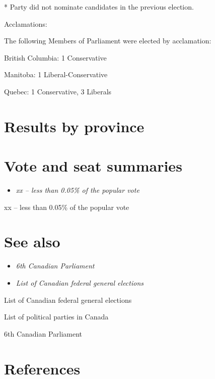 * Party did not nominate candidates in the previous election.

Acclamations:

The following Members of Parliament were elected by acclamation:

British Columbia: 1 Conservative

Manitoba: 1 Liberal-Conservative

Quebec: 1 Conservative, 3 Liberals

\section{Results by province}\label{results-by-province}

\section{Vote and seat summaries}\label{vote-and-seat-summaries}

\begin{itemize}
\item
  \emph{xx -- less than 0.05\% of the popular vote}
\end{itemize}

xx -- less than 0.05\% of the popular vote

\section{See also}\label{see-also}

\begin{itemize}
\item
  \emph{6th Canadian Parliament}
\item
  \emph{List of Canadian federal general elections}
\end{itemize}

List of Canadian federal general elections

List of political parties in Canada

6th Canadian Parliament

\section{References}\label{references}

